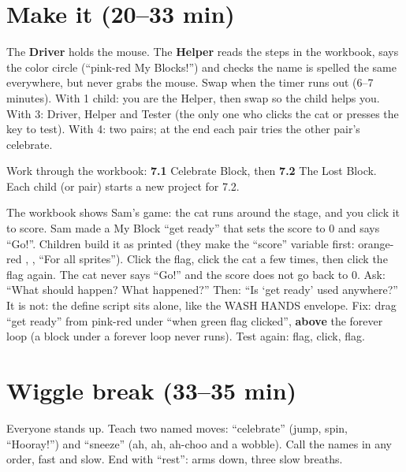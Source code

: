 \section{Make it (20--33 min)}
\begin{pairroles}
The \textbf{Driver} holds the mouse. The \textbf{Helper} reads the steps in the workbook, says the color circle (\enquote{pink-red My Blocks!}) and checks the name is spelled the same everywhere, but never grabs the mouse. Swap when the timer runs out (6--7 minutes). With 1 child: you are the Helper, then swap so the child helps you. With 3: Driver, Helper and Tester (the only one who clicks the cat or presses the key to test). With 4: two pairs; at the end each pair tries the other pair's celebrate.
\end{pairroles}

Work through the workbook: \textbf{7.1} Celebrate Block, then \textbf{7.2} The Lost Block. Each child (or pair) starts a new project for 7.2.

\begin{bughunt}
The workbook shows Sam's game: the cat runs around the stage, and you click it to score. Sam made a My Block \enquote{get ready} that sets the score to 0 and says \enquote{Go!}. Children build it as printed (they make the \enquote{score} variable first: orange-red , , \enquote{For all sprites}). Click the flag, click the cat a few times, then click the flag again. The cat never says \enquote{Go!} and the score does not go back to 0. Ask: \enquote{What should happen? What happened?} Then: \enquote{Is \enquote{get ready} used anywhere?} It is not: the define script sits alone, like the WASH HANDS envelope. Fix: drag \enquote{get ready} from pink-red  under \enquote{when green flag clicked}, \textbf{above} the forever loop (a block under a forever loop never runs). Test again: flag, click, flag.
\end{bughunt}

\section{Wiggle break (33--35 min)}
Everyone stands up. Teach two named moves: \enquote{celebrate} (jump, spin, \enquote{Hooray!}) and \enquote{sneeze} (ah, ah, ah-choo and a wobble). Call the names in any order, fast and slow. End with \enquote{rest}: arms down, three slow breaths.

